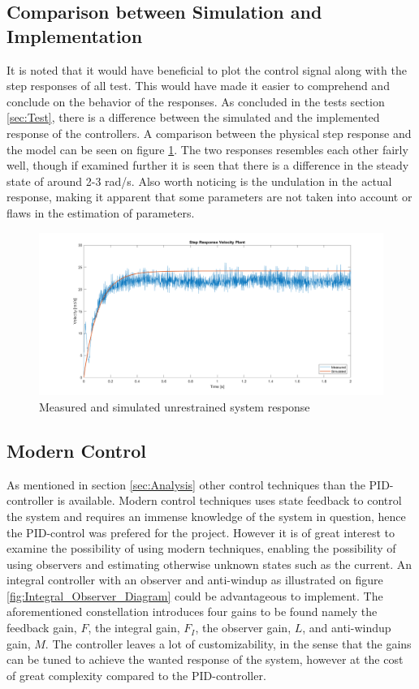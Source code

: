 \documentclass[../../main.tex]{subfiles}
\begin{document}
\subsection*{Comparison between Simulation and Implementation}
It is noted that it would have beneficial to plot the control signal along with the step responses of all test. This would have made it easier to comprehend and conclude on the behavior of the responses. 
As concluded in the tests section \ref{sec:Test}, there is a difference between the simulated and the implemented response of the controllers. A comparison between the physical step response and the model can be seen on figure \ref{fig:Mes_vs_siml}. The two responses resembles each other fairly well, though if examined further it is seen that there is a difference in the steady state of around 2-3 \si{rad/s}. Also worth noticing is the undulation in the actual response, making it apparent that some parameters are not taken into account or flaws in the estimation of parameters. 

\begin{figure}
    \centering
    \includegraphics[width = 0.9 \textwidth]{Sections/Miscellaneous/Images/velocityPlantMes_vs_Sim.png}
    \caption{Measured and simulated unrestrained system response}
    \label{fig:Mes_vs_siml}
\end{figure}



\subsection*{Modern Control}
As mentioned in section \ref{sec:Analysis} other control techniques than the PID-controller is available. Modern control techniques uses state feedback to control the system and requires an immense knowledge of the system in question, hence the PID-control was prefered for the project. However it is of great interest to examine the possibility of using modern techniques, enabling the possibility of using observers and estimating otherwise unknown states such as the current. An integral controller with an observer and anti-windup as illustrated on figure \ref{fig:Integral_Observer_Diagram} could be advantageous to implement. The aforementioned constellation introduces four gains to be found namely the feedback gain, $F$, the integral gain, $F_I$, the observer gain, $L$, and anti-windup gain, $M$. The controller leaves a lot of customizability, in the sense that the gains can be tuned to achieve the wanted response of the system, however at the cost of great complexity compared to the PID-controller.
\end{document}
